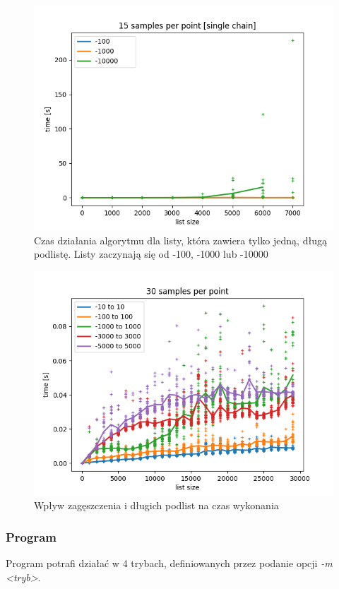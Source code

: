 \documentclass[11pt]{article} %
\begin{document}
\begin{figure}[h]
\caption{Czas działania algorytmu dla listy, która zawiera tylko jedną, długą podlistę. Listy zaczynają się od -100, -1000 lub -10000}
\label{rys3}
\centering
\includegraphics[scale=0.8]{bigboy}
\end{figure}

\begin{figure}[h]
\caption{Wpływ zagęszczenia i długich podlist na czas wykonania}
\label{rys4}
\centering
\includegraphics[scale=0.8]{sparsity}
\end{figure}

\subsubsection{Program}
Program potrafi działać w 4 trybach, definiowanych przez podanie opcji \textsl{-m <tryb>}.
\end{document}
